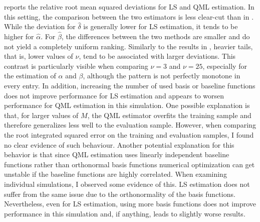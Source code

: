 \documentclass[12pt,a4paper]{article}
\theoremstyle{definition}
\begin{document}
 reports the relative root mean squared deviations for LS and QML estimation. In this setting, the comparison between the two estimators is less clear-cut than in . While the deviation for $\hat{\delta}$ is generally lower for LS estimation, it tends to be higher for $\hat{\alpha}$. For $\hat{\beta}$, the differences between the two methods are smaller and do not yield a completely uniform ranking. Similarly to the results in , heavier tails, that is, lower values of $\nu$, tend to be associated with larger deviations. This contrast is particularly visible when comparing $\nu = 3$ and $\nu=25$, especially for the estimation of $\alpha$ and $\beta$, although the pattern is not perfectly monotone in every entry. In addition, increasing the number of used basis or baseline functions does not improve performance for LS estimation and appears to worsen performance for QML estimation in this simulation. One possible explanation is that, for larger values of $M$, the QML estimator overfits the training sample and therefore generalizes less well to the evaluation sample. However, when comparing the root integrated squared error on the training and evaluation samples, I found no clear evidence of such behaviour. Another potential explanation for this behavior is that since QML estimation uses linearly independent baseline functions rather than orthonormal basis functions numerical optimization can get unstable if the baseline functions are highly correlated. When examining individual simulations, I observed some evidence of this. LS estimation does not suffer from the same issue due to the orthonormality of the basis functions. Nevertheless, even for LS estimation, using more basis functions does not improve performance in this simulation and, if anything, leads to slightly worse results.
\end{document}
